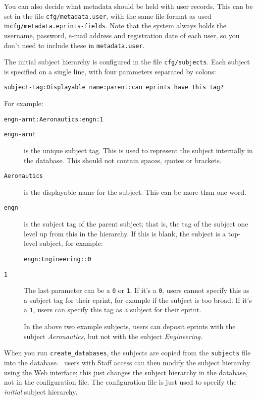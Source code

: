 You can also decide what metadata should be held with user records. This can be set in the file {\tt cfg/metadata.user}, with the same file format as used in{\tt cfg/metadata.eprints-fields}. Note that the system always holds the username, password, e-mail address and registration date of each user, so you don't need to include these in {\tt metadata.user}.

The initial subject hierarchy is configured in the file {\tt cfg/subjects}. Each subject is specified on a single line, with four parameters separated by colons:

\begin{verbatim}
subject-tag:Displayable name:parent:can eprints have this tag?
\end{verbatim}

For example:

\begin{verbatim}
engn-arnt:Aeronautics:engn:1
\end{verbatim}

\begin{description}
\item[{\tt engn-arnt}] is the unique subject tag. This is used to represent the subject internally in the database. This should not contain spaces, quotes or brackets.
\item[{\tt Aeronautics}] is the displayable name for the subject. This can be more than one word.
\item[{\tt engn}] is the subject tag of the parent subject; that is, the tag of the subject one level up from this in the hierarchy. If this is blank, the subject is a top-level subject, for example:

\begin{verbatim}
engn:Engineering::0
\end{verbatim}

\item[{\tt 1}] The last parameter can be a {\tt 0} or {\tt 1}. If it's a {\tt 0}, users cannot specify this as a subject tag for their eprint, for example if the subject is too broad. If it's a {\tt 1}, users can specify this tag as a subject for their eprint.

In the above two example subjects, users can deposit eprints with the subject \emph{Aeronautics}, but not with the subject \emph{Engineering}.
\end{description}

When you run {\tt create\_databases}, the subjects are copied from the {\tt subjects} file into the database. \eprints\ users with Staff access can then modify the subject hierarchy using the Web interface; this just changes the subject hierarchy in the database, not in the configuration file. The configuration file is just used to specify the \emph{initial} subject hierarchy.


